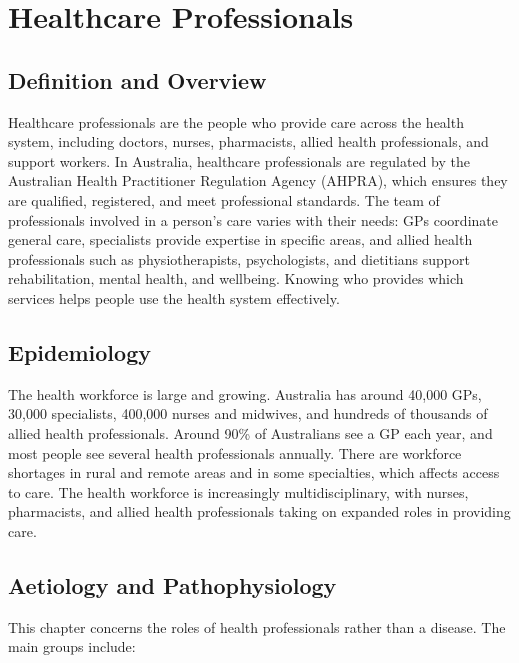 \chapter{Healthcare Professionals}

\section*{Definition and Overview}
Healthcare professionals are the people who provide care across the health system, including doctors, nurses, pharmacists, allied health professionals, and support workers. In Australia, healthcare professionals are regulated by the Australian Health Practitioner Regulation Agency (AHPRA), which ensures they are qualified, registered, and meet professional standards. The team of professionals involved in a person's care varies with their needs: GPs coordinate general care, specialists provide expertise in specific areas, and allied health professionals such as physiotherapists, psychologists, and dietitians support rehabilitation, mental health, and wellbeing. Knowing who provides which services helps people use the health system effectively.

\section*{Epidemiology}
The health workforce is large and growing. Australia has around 40,000 GPs, 30,000 specialists, 400,000 nurses and midwives, and hundreds of thousands of allied health professionals. Around 90\% of Australians see a GP each year, and most people see several health professionals annually. There are workforce shortages in rural and remote areas and in some specialties, which affects access to care. The health workforce is increasingly multidisciplinary, with nurses, pharmacists, and allied health professionals taking on expanded roles in providing care.

\section*{Aetiology and Pathophysiology}
This chapter concerns the roles of health professionals rather than a disease. The main groups include:


